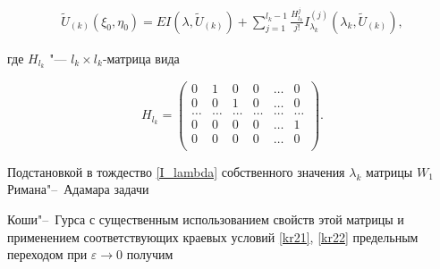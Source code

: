 \begin{gather*}

\tilde{U}_{(k)}(\xi_0,\eta_0)= EI(\lambda,\tilde{U}_{(k)})+

\sum\limits_{j=1}^{l_k-1}\frac{H_{l_k}^j}{j!} I^{(j)}_{\lambda_k}(\lambda_k,\tilde{U}_{(k)}),

\end{gather*}

где $H_{l_k}$ "--- $l_k \times l_k$-матрица вида

\begin{equation*}

\label{H}

 H_{l_k}=

\left(

\begin{array}{cccccc}

  0 & 1 & 0 & 0 & \dots & 0\\

  0 & 0 & 1 & 0 & \dots & 0\\

  \dots & \dots & \dots & \dots & \dots & \dots \\

  0 & 0 & 0 & 0 & \dots & 1\\

  0 & 0 & 0 & 0 & \dots & 0\\

\end{array}

\right).

\end{equation*}



Подстановкой в тождество \eqref{I_lambda} собственного значения $\lambda_k$ матрицы $W_1$ Римана"--~Адамара задачи 

Коши"--~Гурса с существенным использованием \linebreak свойств этой матрицы и применением соответствующих краевых условий \eqref{kr21}, \eqref{kr22} предельным переходом при $\varepsilon \to 0$ получим 

